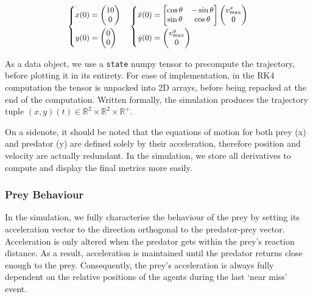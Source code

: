 \documentclass[11pt, twocolumn]{article}
\begin{document}
\[
  \small
  \begin{array}{l}
    \left\{
      \begin{aligned}
        x(0) &=
        \begin{pmatrix} 10 \\ 0
        \end{pmatrix} \\
        y(0) &=
        \begin{pmatrix} 0 \\ 0
        \end{pmatrix}
      \end{aligned}
      \right.
    \end{array}
    \begin{array}{l}
      \left\{
        \begin{aligned}
          \dot{x}(0) &=
          \begin{bmatrix}
            \cos\theta & -\sin\theta \\
            \sin\theta & \cos\theta
          \end{bmatrix}
          \begin{pmatrix}
            v^x_{\text{max}} \\
            0
          \end{pmatrix} \\
          \dot{y}(0) &=
          \begin{pmatrix} v^y_{\text{max}} \\ 0
          \end{pmatrix}
        \end{aligned}
        \right.
      \end{array}
    \]

    As a data object, we use a \texttt{state} numpy tensor to precompute the trajectory, before plotting it in its entirety. For ease of implementation, in the RK4 computation the tensor is unpacked into 2D arrays, before being repacked at the end of the computation. Written formally, the simulation produces the trajectory tuple $(x,y)(t)\in \mathbb{R}^2 \times \mathbb{R}^2 \times \mathbb{R}^+$.

    On a sidenote, it should be noted that the equations of motion for both prey (x) and predator (y) are defined solely by their acceleration, therefore position and velocity are actually redundant. In the simulation, we store all derivatives to compute and display the final metrics more easily.

    \subsubsection{Prey Behaviour}
    In the simulation, we fully characterise the behaviour of the prey by setting its acceleration vector to the direction orthogonal to the predator-prey vector. Acceleration is only altered when the predator gets within the prey's reaction distance. As a result, acceleration is maintained until the predator returns close enough to the prey. Consequently, the prey's acceleration is always fully dependent on the relative positions of the agents during the last `near miss' event.
\end{document}
